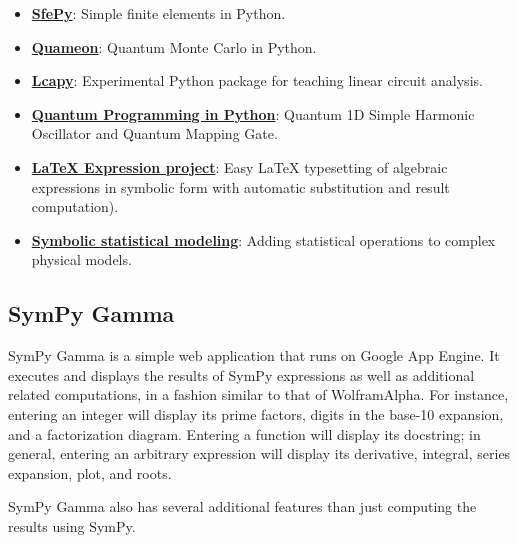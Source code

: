\begin{itemize}
\item
  \href{http://sfepy.org/}{\textbf{SfePy}}: Simple finite elements in
  Python.
\item
  \href{http://quameon.sourceforge.net/}{\textbf{Quameon}}: Quantum
  Monte Carlo in Python.
\item
  \href{http://lcapy.elec.canterbury.ac.nz/}{\textbf{Lcapy}}:
  Experimental Python package for teaching linear circuit analysis.
\item
  \href{http://digitalcommons.calpoly.edu/cgi/viewcontent.cgi?article=1072\&context=physsp/}{\textbf{Quantum
  Programming in Python}}: Quantum 1D Simple Harmonic Oscillator and
  Quantum Mapping Gate.
\item
  \href{http://mech.fsv.cvut.cz/~stransky/software/latexexpr/doc/}{\textbf{LaTeX
  Expression project}}: Easy LaTeX typesetting of algebraic expressions
  in symbolic form with automatic substitution and result computation).
\item
  \href{https://www.researchgate.net/publication/260585491_Symbolic_Statistics_with_SymPy/}{\textbf{Symbolic
  statistical modeling}}: Adding statistical operations to complex
  physical models.
\end{itemize}

\subsection{SymPy Gamma}\label{sympy-gamma}

SymPy Gamma is a simple web application that runs on Google App Engine. 
It executes and displays the results of SymPy expressions as well as
additional related computations, in a fashion similar to that of
Wolfram\textbar{}Alpha. For instance, entering an integer will display
its prime factors, digits in the base-10 expansion, and a factorization
diagram. Entering a function will display its docstring; in general,
entering an arbitrary expression will display its derivative, integral,
series expansion, plot, and roots.

SymPy Gamma also has several additional features than just computing the
results using SymPy.

